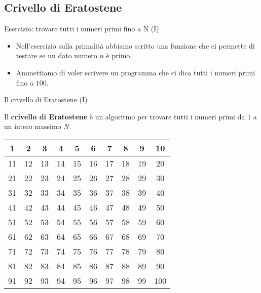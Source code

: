 \subsection{Crivello di Eratostene}

\begin{frame}{Esercizio: trovare tutti i numeri primi fino a N (I)}

  \begin{itemize}
   \item   Nell'esercizio sulla primalità abbiamo scritto una funzione che
   ci permette di testare se un dato numero $n$ è primo.
   \item Ammettiamo di voler scrivere un programma che ci dica tutti i numeri primi
   fino a $100$.
  \end{itemize}
\end{frame}

\begin{frame}{Il crivello di Eratostene (I)}

  Il \textbf{crivello di Eratostene} è un algoritmo per trovare
  tutti i numeri primi da $1$ a un intero massimo $N$.

  \begin{table}[]
  \centering
    \begin{tabular}{|c|c|c|c|c|c|c|c|c|c|}
      \hline
      1  & 2  & 3  & 4  & 5  & 6  & 7  & 8  & 9  & 10  \\ \hline
      11 & 12 & 13 & 14 & 15 & 16 & 17 & 18 & 19 & 20  \\ \hline
      21 & 22 & 23 & 24 & 25 & 26 & 27 & 28 & 29 & 30  \\ \hline
      31 & 32 & 33 & 34 & 35 & 36 & 37 & 38 & 39 & 40  \\ \hline
      41 & 42 & 43 & 44 & 45 & 46 & 47 & 48 & 49 & 50  \\ \hline
      51 & 52 & 53 & 54 & 55 & 56 & 57 & 58 & 59 & 60  \\ \hline
      61 & 62 & 63 & 64 & 65 & 66 & 67 & 68 & 69 & 70  \\ \hline
      71 & 72 & 73 & 74 & 75 & 76 & 77 & 78 & 79 & 80  \\ \hline
      81 & 82 & 83 & 84 & 85 & 86 & 87 & 88 & 89 & 90  \\ \hline
      91 & 92 & 93 & 94 & 95 & 96 & 97 & 98 & 99 & 100 \\ \hline
    \end{tabular}
  \end{table}

\end{frame}

